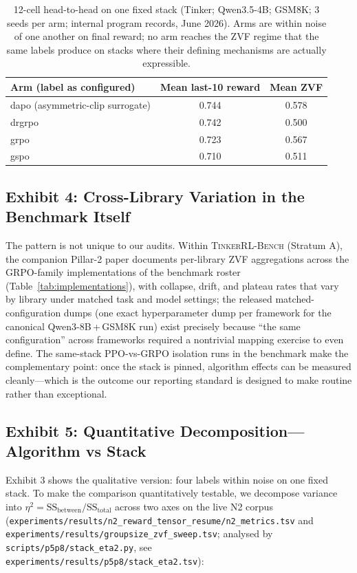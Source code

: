 \documentclass{article}  \usepackage[preprint,nonatbib]{neurips_2026} \usepackage[numbers]{natbib}
\newcommand{\ours}{\textsc{TinkerRL-Bench}}
\providecommand{\tableref}[1]{Table~\ref{#1}}
\begin{document}
\begin{table}[t]
\centering
\caption{12-cell head-to-head on one fixed stack (Tinker; Qwen3.5-4B; GSM8K;
3 seeds per arm; internal program records, June 2026). Arms are within noise
of one another on final reward; no arm reaches the ZVF regime that the same
labels produce on stacks where their defining mechanisms are actually
expressible.}
\label{tab:p5-h2h}
\small
\begin{tabular}{@{}lcc@{}}
\toprule
Arm (label as configured) & Mean last-10 reward & Mean ZVF \\
\midrule
dapo (asymmetric-clip surrogate) & 0.744 & 0.578 \\
drgrpo                           & 0.742 & 0.500 \\
grpo                             & 0.723 & 0.567 \\
gspo                             & 0.710 & 0.511 \\
\bottomrule
\end{tabular}
\end{table}

\subsection{Exhibit 4: Cross-Library Variation in the Benchmark Itself}
\label{sec:p5-exhibit-library}
The pattern is not unique to our audits. Within \ours{} (Stratum A), the
companion Pillar-2 paper documents per-library ZVF aggregations across the
GRPO-family implementations of the benchmark roster
(\tableref{tab:implementations}), with collapse, drift, and plateau rates that
vary by library under matched task and model settings; the released
matched-configuration dumps (one exact hyperparameter dump per framework for
the canonical Qwen3-8B\,+\,GSM8K run) exist precisely because ``the same
configuration'' across frameworks required a nontrivial mapping exercise to
even define. The same-stack PPO-vs-GRPO isolation runs in the benchmark make
the complementary point: once the stack is pinned, algorithm effects can be
measured cleanly---which is the outcome our reporting standard is designed to
make routine rather than exceptional.

\subsection{Exhibit 5: Quantitative Decomposition---Algorithm vs Stack}
\label{sec:p5-exhibit-eta2}
Exhibit 3 shows the qualitative version: four labels within noise on one
fixed stack. To make the comparison quantitatively testable, we decompose
variance into $\eta^{2} = \mathrm{SS}_{\text{between}} / \mathrm{SS}_{\text{total}}$
across two axes on the live N2 corpus
(\texttt{experiments/results/n2\_reward\_tensor\_resume/n2\_metrics.tsv} and
\texttt{experiments/results/groupsize\_zvf\_sweep.tsv}; analysed by
\texttt{scripts/p5p8/stack\_eta2.py}, see
\texttt{experiments/results/p5p8/stack\_eta2.tsv}):
\end{document}
